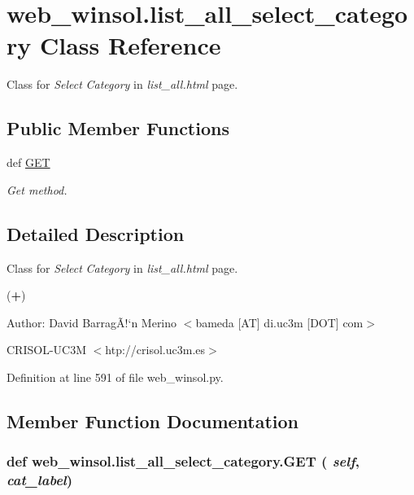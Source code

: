 \hypertarget{classweb__winsol_1_1list__all__select__category}{
\section{web\_\-winsol.list\_\-all\_\-select\_\-category Class Reference}
\label{classweb__winsol_1_1list__all__select__category}
}
Class for {\em Select\/} {\em Category\/} in {\em list\_\-all.html\/} page.  


\subsection*{Public Member Functions}
\begin{CompactItemize}
\item 
def \hyperlink{classweb__winsol_1_1list__all__select__category_15b77a5482c54323468c3ff78ea23aea}{GET}
\begin{CompactList}\small\item\em Get method. \item\end{CompactList}\end{CompactItemize}


\subsection{Detailed Description}
Class for {\em Select\/} {\em Category\/} in {\em list\_\-all.html\/} page. 

({\bf +})

\begin{Desc}
\item[Author:]David Barrag\~{A}!`n Merino $<$bameda \mbox{[}AT\mbox{]} di.uc3m \mbox{[}DOT\mbox{]} com$>$ 

CRISOL-UC3M $<$htp://crisol.uc3m.es$>$ \end{Desc}




Definition at line 591 of file web\_\-winsol.py.

\subsection{Member Function Documentation}
\hypertarget{classweb__winsol_1_1list__all__select__category_15b77a5482c54323468c3ff78ea23aea}{
\subsubsection[GET]{\setlength{\rightskip}{0pt plus 5cm}def web\_\-winsol.list\_\-all\_\-select\_\-category.GET ( {\em self},  {\em cat\_\-label})}}
\label{classweb__winsol_1_1list__all__select__category_15b77a5482c54323468c3ff78ea23aea}


